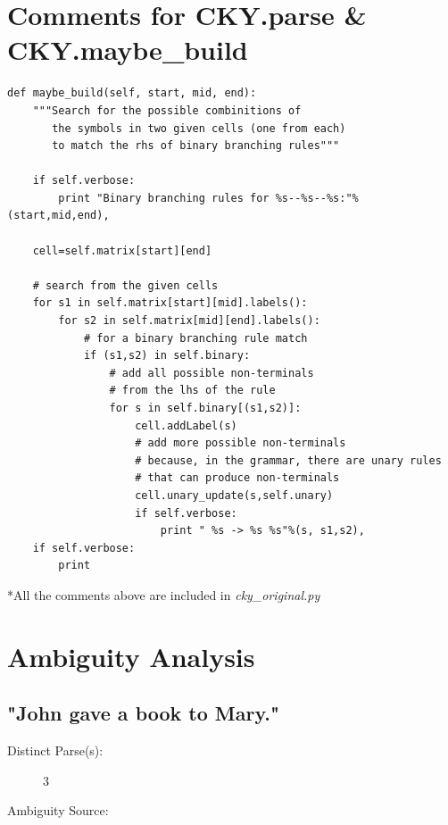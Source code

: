 \documentclass{article}
\begin{document}
\section{Comments for CKY.parse \& CKY.maybe\_build}
\begin{lstlisting}
def maybe_build(self, start, mid, end):
	"""Search for the possible combinitions of 
	   the symbols in two given cells (one from each) 
	   to match the rhs of binary branching rules"""
	   
	if self.verbose:
		print "Binary branching rules for %s--%s--%s:"%(start,mid,end),
	
	cell=self.matrix[start][end]
	
	# search from the given cells
	for s1 in self.matrix[start][mid].labels():
		for s2 in self.matrix[mid][end].labels():
			# for a binary branching rule match
			if (s1,s2) in self.binary:
				# add all possible non-terminals
				# from the lhs of the rule
				for s in self.binary[(s1,s2)]:
					cell.addLabel(s)
					# add more possible non-terminals 
					# because, in the grammar, there are unary rules 
					# that can produce non-terminals
					cell.unary_update(s,self.unary)
					if self.verbose:
						print " %s -> %s %s"%(s, s1,s2),
	if self.verbose:
		print 

\end{lstlisting}
\hfill \break

*All the comments above are included in \textit{cky\_original.py}

\hfill \break


\section{Ambiguity Analysis}

\subsection{"John gave a book to Mary."}

\begin{description}
	\item[Distinct Parse(s):]
	3
	\item[Ambiguity Source:]
	
\end{description}
\end{document}
